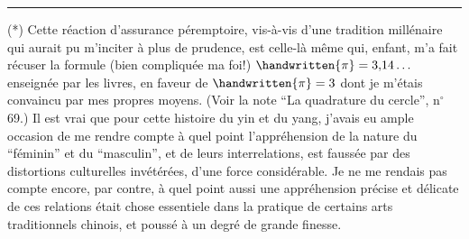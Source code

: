 \noindent\rule{.22\linewidth}{.4pt}\par
(*) Cette réaction d'assurance péremptoire, vis-à-vis d'une tradition millénaire qui aurait pu m'inciter à plus de prudence, est celle-là même qui, enfant, m'a fait récuser la formule (bien compliquée ma foi!) $\handwritten{\pi}=3{,}14\ldots$ enseignée par les livres, en faveur de $\handwritten{\pi}=3$ dont je m'étais convaincu par mes propres moyens. (Voir la note ``La quadrature du cercle'', n$^\circ$ 69.) Il est vrai que pour cette histoire du yin et du yang, j'avais eu ample occasion de me rendre compte à quel point l'appréhension de la nature du ``féminin'' et du ``masculin'', et de leurs interrelations, est faussée par des distortions culturelles invétérées, d'une force considérable. Je ne me rendais pas compte encore, par contre, à quel point aussi une appréhension précise et délicate de ces relations était chose essentiele dans la pratique de certains arts traditionnels chinois, et poussé à un degré de grande finesse.


